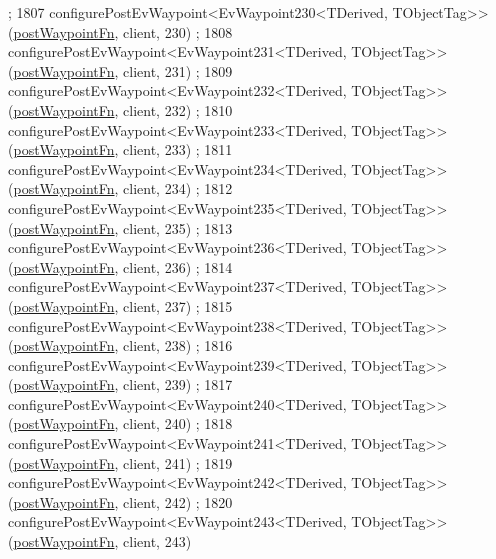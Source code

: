 \begin{DoxyCode}
      ;
1807     configurePostEvWaypoint<EvWaypoint230<TDerived, TObjectTag>>(\hyperlink{classsmacc_1_1WaypointEventDispatcher_a6bccf6a93a827634b7b5e67ac0e4ec57}{postWaypointFn}, client, 230)
      ;
1808     configurePostEvWaypoint<EvWaypoint231<TDerived, TObjectTag>>(\hyperlink{classsmacc_1_1WaypointEventDispatcher_a6bccf6a93a827634b7b5e67ac0e4ec57}{postWaypointFn}, client, 231)
      ;
1809     configurePostEvWaypoint<EvWaypoint232<TDerived, TObjectTag>>(\hyperlink{classsmacc_1_1WaypointEventDispatcher_a6bccf6a93a827634b7b5e67ac0e4ec57}{postWaypointFn}, client, 232)
      ;
1810     configurePostEvWaypoint<EvWaypoint233<TDerived, TObjectTag>>(\hyperlink{classsmacc_1_1WaypointEventDispatcher_a6bccf6a93a827634b7b5e67ac0e4ec57}{postWaypointFn}, client, 233)
      ;
1811     configurePostEvWaypoint<EvWaypoint234<TDerived, TObjectTag>>(\hyperlink{classsmacc_1_1WaypointEventDispatcher_a6bccf6a93a827634b7b5e67ac0e4ec57}{postWaypointFn}, client, 234)
      ;
1812     configurePostEvWaypoint<EvWaypoint235<TDerived, TObjectTag>>(\hyperlink{classsmacc_1_1WaypointEventDispatcher_a6bccf6a93a827634b7b5e67ac0e4ec57}{postWaypointFn}, client, 235)
      ;
1813     configurePostEvWaypoint<EvWaypoint236<TDerived, TObjectTag>>(\hyperlink{classsmacc_1_1WaypointEventDispatcher_a6bccf6a93a827634b7b5e67ac0e4ec57}{postWaypointFn}, client, 236)
      ;
1814     configurePostEvWaypoint<EvWaypoint237<TDerived, TObjectTag>>(\hyperlink{classsmacc_1_1WaypointEventDispatcher_a6bccf6a93a827634b7b5e67ac0e4ec57}{postWaypointFn}, client, 237)
      ;
1815     configurePostEvWaypoint<EvWaypoint238<TDerived, TObjectTag>>(\hyperlink{classsmacc_1_1WaypointEventDispatcher_a6bccf6a93a827634b7b5e67ac0e4ec57}{postWaypointFn}, client, 238)
      ;
1816     configurePostEvWaypoint<EvWaypoint239<TDerived, TObjectTag>>(\hyperlink{classsmacc_1_1WaypointEventDispatcher_a6bccf6a93a827634b7b5e67ac0e4ec57}{postWaypointFn}, client, 239)
      ;
1817     configurePostEvWaypoint<EvWaypoint240<TDerived, TObjectTag>>(\hyperlink{classsmacc_1_1WaypointEventDispatcher_a6bccf6a93a827634b7b5e67ac0e4ec57}{postWaypointFn}, client, 240)
      ;
1818     configurePostEvWaypoint<EvWaypoint241<TDerived, TObjectTag>>(\hyperlink{classsmacc_1_1WaypointEventDispatcher_a6bccf6a93a827634b7b5e67ac0e4ec57}{postWaypointFn}, client, 241)
      ;
1819     configurePostEvWaypoint<EvWaypoint242<TDerived, TObjectTag>>(\hyperlink{classsmacc_1_1WaypointEventDispatcher_a6bccf6a93a827634b7b5e67ac0e4ec57}{postWaypointFn}, client, 242)
      ;
1820     configurePostEvWaypoint<EvWaypoint243<TDerived, TObjectTag>>(\hyperlink{classsmacc_1_1WaypointEventDispatcher_a6bccf6a93a827634b7b5e67ac0e4ec57}{postWaypointFn}, client, 243)

\end{DoxyCode}
